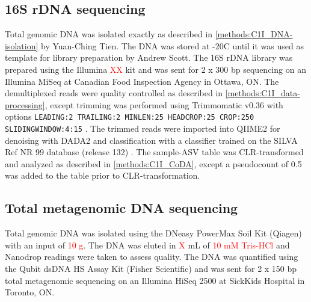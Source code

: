 \subsection{16S rDNA sequencing}

Total genomic DNA was isolated exactly as described in \ref{methods:C1I_DNA-isolation} by Yuan-Ching Tien.
The DNA was stored at -20\degree C until it was used as template for library preparation by Andrew Scott.
The 16S rDNA library was prepared using the Illumina \textcolor{red}{XX} kit and was sent for 2 x 300 bp sequencing on an Illumina MiSeq at Canadian Food Inspection Agency in Ottawa, ON.
The demultiplexed reads were quality controlled as described in \ref{methods:C1I_data-processing}, except trimming was performed using Trimmomatic v0.36 with options \texttt{LEADING:2 TRAILING:2 MINLEN:25 HEADCROP:25 CROP:250 SLIDINGWINDOW:4:15} \dummyref.
The trimmed reads were imported into QIIME2 for denoising with DADA2 and classification with a classifier trained on the SILVA Ref NR 99 database (release 132) \dummyref.
The sample-ASV table was CLR-transformed and analyzed as described in \ref{methods:C1I_CoDA}, except a pseudocount of 0.5 was added to the table prior to CLR-transformation.

\subsection{Total metagenomic DNA sequencing}

Total genomic DNA was isolated using the DNeasy PowerMax Soil Kit (Qiagen) with an input of \textcolor{red}{10 g}.
The DNA was eluted in \textcolor{red}{X} mL of \textcolor{red}{10 mM Tris-HCl} and Nanodrop readings were taken to assess quality.
The DNA was quantified using the Qubit dsDNA HS Assay Kit (Fisher Scientific) and was sent for 2 x 150 bp total metagenomic sequencing on an Illumina HiSeq 2500 at SickKids Hospital in Toronto, ON.
